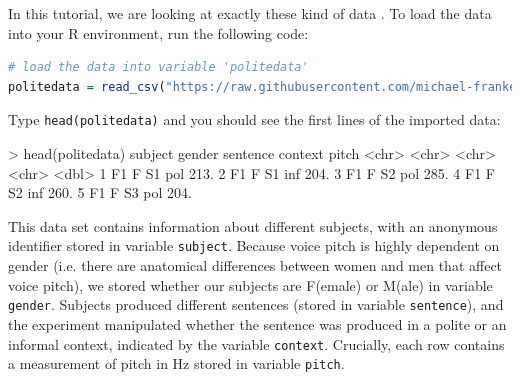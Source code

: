 \documentclass[nobib]{tufte-handout}
\newcommand{\ri}[1]{\lstinline{#1}}  %
\begin{document}
In this tutorial, we are looking at exactly these kind of data
\citep[following][]{Winter2013:Linear-models-a}. To load the data into your R environment,
run the following code:

\bigskip

\begin{minipage}[]{\textwidth}
\begin{lstlisting}[language=R]
# load the data into variable 'politedata'
politedata = read_csv("https://raw.githubusercontent.com/michael-franke/bayes_mixed_regression_tutorial/master/code/politeness_data.csv")
\end{lstlisting}
\end{minipage}

\vspace*{-0.5cm}

\noindent Type \ri{head(politedata)} and you should see the first lines of the imported
data:

\bigskip

\begin{minipage}[]{\textwidth}
\begin{rc}
> head(politedata)
   subject gender sentence context pitch
   <chr>   <chr>  <chr>    <chr>   <dbl>
 1 F1      F      S1       pol      213.
 2 F1      F      S1       inf      204.
 3 F1      F      S2       pol      285.
 4 F1      F      S2       inf      260.
 5 F1      F      S3       pol      204.
\end{rc}
\end{minipage}


\medskip

\noindent This data set contains information about different subjects, with an anonymous identifier stored in variable \texttt{subject}.
Because voice pitch is highly dependent on gender (i.e. there are anatomical differences between women and men that affect voice pitch), we stored whether our subjects are F(emale) or M(ale) in variable \texttt{gender}.
Subjects produced different sentences (stored in variable \texttt{sentence}), and the experiment manipulated whether the sentence was produced in a polite or an informal context, indicated by the variable \texttt{context}. Crucially, each row contains a measurement of pitch in Hz stored in variable \texttt{pitch}.
\end{document}
